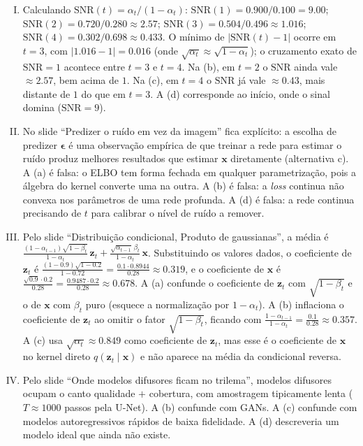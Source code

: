 \documentclass{dlproblemset}
\begin{document}
\begin{enumerate}[I)]
    \item Calculando $\mathrm{SNR}(t) = \alpha_t / (1 - \alpha_t)$: $\mathrm{SNR}(1) = 0.900/0.100 = 9.00$; $\mathrm{SNR}(2) = 0.720/0.280 \approx 2.57$; $\mathrm{SNR}(3) = 0.504/0.496 \approx 1.016$; $\mathrm{SNR}(4) = 0.302/0.698 \approx 0.433$. O mínimo de $|\mathrm{SNR}(t) - 1|$ ocorre em $t = 3$, com $|1.016 - 1| = 0.016$ (onde $\sqrt{\alpha_t} \approx \sqrt{1 - \alpha_t}$); o cruzamento exato de $\mathrm{SNR} = 1$ acontece entre $t = 3$ e $t = 4$. Na (b), em $t = 2$ o $\mathrm{SNR}$ ainda vale $\approx 2.57$, bem acima de $1$. Na (c), em $t = 4$ o $\mathrm{SNR}$ já vale $\approx 0.43$, mais distante de $1$ do que em $t = 3$. A (d) corresponde ao início, onde o sinal domina ($\mathrm{SNR} = 9$).
    \item No slide ``Predizer o ruído em vez da imagem'' fica explícito: a escolha de predizer $\boldsymbol{\epsilon}$ é uma observação empírica de que treinar a rede para estimar o ruído produz melhores resultados que estimar $\mathbf{x}$ diretamente (alternativa c). A (a) é falsa: o ELBO tem forma fechada em qualquer parametrização, pois a álgebra do kernel converte uma na outra. A (b) é falsa: a \textit{loss} continua não convexa nos parâmetros de uma rede profunda. A (d) é falsa: a rede continua precisando de $t$ para calibrar o nível de ruído a remover.
    \item Pelo slide ``Distribuição condicional, Produto de gaussianas'', a média é $\tfrac{(1 - \alpha_{t-1})\sqrt{1 - \beta_t}}{1 - \alpha_t}\, \mathbf{z}_t + \tfrac{\sqrt{\alpha_{t-1}}\,\beta_t}{1 - \alpha_t}\, \mathbf{x}$. Substituindo os valores dados, o coeficiente de $\mathbf{z}_t$ é $\tfrac{(1 - 0.9)\sqrt{1 - 0.2}}{1 - 0.72} = \tfrac{0.1\cdot 0.8944}{0.28} \approx 0.319$, e o coeficiente de $\mathbf{x}$ é $\tfrac{\sqrt{0.9}\cdot 0.2}{0.28} = \tfrac{0.9487\cdot 0.2}{0.28} \approx 0.678$. A (a) confunde o coeficiente de $\mathbf{z}_t$ com $\sqrt{1 - \beta_t}$ e o de $\mathbf{x}$ com $\beta_t$ puro (esquece a normalização por $1 - \alpha_t$). A (b) inflaciona o coeficiente de $\mathbf{z}_t$ ao omitir o fator $\sqrt{1 - \beta_t}$, ficando com $\tfrac{1 - \alpha_{t-1}}{1 - \alpha_t} = \tfrac{0.1}{0.28} \approx 0.357$. A (c) usa $\sqrt{\alpha_t} \approx 0.849$ como coeficiente de $\mathbf{z}_t$, mas esse é o coeficiente de $\mathbf{x}$ no kernel direto $q(\mathbf{z}_t \mid \mathbf{x})$ e não aparece na média da condicional reversa.
    \item Pelo slide ``Onde modelos difusores ficam no trilema'', modelos difusores ocupam o canto qualidade $+$ cobertura, com amostragem tipicamente lenta ($T \approx 1000$ passos pela U-Net). A (b) confunde com GANs. A (c) confunde com modelos autoregressivos rápidos de baixa fidelidade. A (d) descreveria um modelo ideal que ainda não existe.

\end{enumerate}
\end{document}
